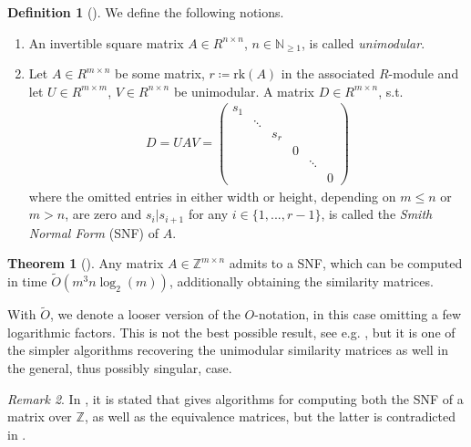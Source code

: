 \documentclass[10pt]{amsart}
\numberwithin{equation}{section}
\theoremstyle{definition}
\newtheorem{theorem}{Theorem}
\newtheorem{definition}{Definition}
\theoremstyle{remark}
\newtheorem{remark}[theorem]{Remark}
\begin{document}
    \begin{definition}[{\cite[p. 1069]{Hafner_1991}}]
        We define the following notions.
        \begin{enumerate}[label=(\roman*), wide]
            \item An invertible square matrix \(A \in R^{n \times n}\), \(n \in \mathbb{N}_{\geq 1}\), is called \emph{unimodular}.
            \item Let \(A \in R^{m \times n}\) be some matrix, \(r \coloneqq \text{rk}(A)\) in the associated \(R\)-module and let \(U \in R^{m \times m}\), \(V \in R^{n \times n}\) be unimodular. A matrix \(D \in R^{m \times n}\), s.t.
            \begin{align}
                D = UAV = \begin{pmatrix}
                    s_1\\
                        & \ddots\\
                        &        & s_r\\
                        &        &      & 0\\
                        &        &      &   & \ddots\\
                        &        &      &   &        & 0
                \end{pmatrix}
            \end{align}
            where the omitted entries in either width or height, depending on \(m \leq n\) or \(m > n\), are zero and \(s_i|s_{i+1}\) for any \(i \in \{1, ..., r-1\}\), is called the \emph{Smith Normal Form} (SNF) of \(A\).
        \end{enumerate}
    \end{definition}

    \begin{theorem}[{\cite[pp. 1073-1074]{Hafner_1991}}]
        Any matrix \(A \in \mathbb{Z}^{m \times n}\) admits to a SNF, which can be computed in time \(\tilde{O}(m^3n\log_2(m))\), additionally obtaining the similarity matrices.
    \end{theorem}

    With \(\tilde{O}\), we denote a looser version of the \(O\)-notation, in this case omitting a few logarithmic factors. This is not the best possible result, see e.g. \cite[pp. 273-274]{Storjohann_1996}, but it is one of the simpler algorithms recovering the unimodular similarity matrices as well in the general, thus possibly singular, case.

    \begin{remark}
        In \cite[p. 23]{Lomont}, it is stated that \cite{Storjohann_1996} gives algorithms for computing both the SNF of a matrix over \(\mathbb{Z}\), as well as the equivalence matrices, but the latter is contradicted in \cite[p. 268]{Storjohann_1996}.
    \end{remark}
\end{document}
